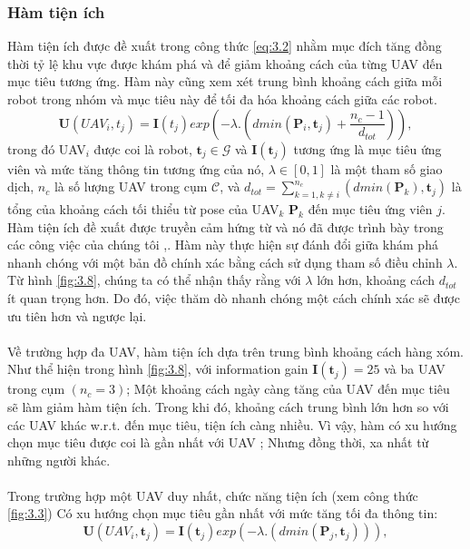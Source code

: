 \documentclass[11pt,openany]{book}
\begin{document}
\subsubsection{Hàm tiện ích}
Hàm tiện ích được đề xuất trong công thức \ref{eq:3.2} nhằm mục đích tăng đồng thời tỷ lệ khu vực được khám phá và để giảm khoảng cách của từng UAV đến mục tiêu tương ứng. Hàm này cũng xem xét trung bình khoảng cách giữa mỗi robot trong nhóm và mục tiêu này để tối đa hóa khoảng cách giữa các robot.
\begin{equation}
    \mathbf{U}(UAV_i,t_j)=\mathbf{I}(t_j)exp(-\lambda.(dmin(\mathbf{P}_i,\mathbf{t}_j)+\frac{n_c-1}{d_{tot}})),
\end{equation}
trong đó UAV$_i$ được coi là robot, $\mathbf{t}_j \in \mathcal{G}$ và $\mathbf{I}(\mathbf{t}_j)$ tương ứng là mục tiêu ứng viên và mức tăng thông tin tương ứng của nó, $\lambda \in [0,1]$ là một tham số giao dịch, $n_c$ là số lượng UAV trong cụm $\mathcal{C}$, và $d_{tot} = \sum_{k=1, k\neq i}^{n_c}(dmin(\mathbf{P}_k),\mathbf{t}_j) $ là tổng của khoảng cách tối thiểu từ pose của UAV$_k$ $\mathbf{P}_k$ đến mục tiêu ứng viên $j$. Hàm tiện ích đề xuất được truyền cảm hứng từ \cite{heng2015efficient} và nó đã được trình bày trong các công việc của chúng tôi \cite{mahdoui2017cooperative},\cite{mahdoui2018cooperative}. Hàm này thực hiện sự đánh đổi giữa khám phá nhanh chóng với một bản đồ chính xác bằng cách sử dụng tham số điều chỉnh $\lambda$. Từ hình \ref{fig:3.8}, chúng ta có thể nhận thấy rằng với $\lambda$ lớn hơn, khoảng cách $d_{tot}$ ít quan trọng hơn. Do đó, việc thăm dò nhanh chóng một cách chính xác sẽ được ưu tiên hơn và ngược lại.\\\\
Về trường hợp đa UAV, hàm tiện ích dựa trên trung bình khoảng cách hàng xóm. Như thể hiện trong hình \ref{fig:3.8}, với information gain $\mathbf{I}(\mathbf{t}_j)=25$ và ba UAV trong cụm $(n_c=3)$; Một khoảng cách ngày càng tăng của UAV đến mục tiêu sẽ làm giảm hàm tiện ích. Trong khi đó, khoảng cách trung bình lớn hơn so với các UAV khác w.r.t. đến mục tiêu, tiện ích càng nhiều. Vì vậy, hàm có xu hướng chọn mục tiêu được coi là gần nhất với UAV ; Nhưng đồng thời, xa nhất từ những người khác.\\\\
Trong trường hợp một UAV duy nhất, chức năng tiện ích (xem công thức \ref{fig:3.3}) Có xu hướng chọn mục tiêu gần nhất với mức tăng tối đa thông tin:
\begin{equation}
    \mathbf{U}(UAV_i,\mathbf{t}_j)=\mathbf{I}(\mathbf{t}_j)exp(-\lambda.(dmin(\mathbf{P}_j,\mathbf{t}_j))),
\end{equation}
\end{document}
